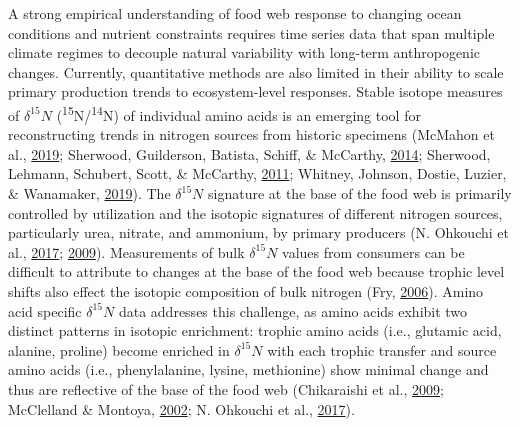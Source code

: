 \documentclass [11pt, proquest] {uwthesis}[2015/03/03]
\begin{document}
A strong empirical understanding of food web response to changing ocean
conditions and nutrient constraints requires time series data that span
multiple climate regimes to decouple natural variability with long-term
anthropogenic changes. Currently, quantitative methods are also limited
in their ability to scale primary production trends to ecosystem-level
responses. Stable isotope measures of \(\delta^{15}N\)
(\textsuperscript{15}N/\textsuperscript{14}N) of individual amino acids
is an emerging tool for reconstructing trends in nitrogen sources from
historic specimens (McMahon et al.,
\protect\hyperlink{ref-McMahon2019}{2019}; Sherwood, Guilderson,
Batista, Schiff, \& McCarthy,
\protect\hyperlink{ref-Sherwood2014}{2014}; Sherwood, Lehmann, Schubert,
Scott, \& McCarthy, \protect\hyperlink{ref-Sherwood2011}{2011}; Whitney,
Johnson, Dostie, Luzier, \& Wanamaker,
\protect\hyperlink{ref-Whitney2019}{2019}). The \(\delta^{15}N\)
signature at the base of the food web is primarily controlled by
utilization and the isotopic signatures of different nitrogen sources,
particularly urea, nitrate, and ammonium, by primary producers (N.
Ohkouchi et al., \protect\hyperlink{ref-Ohkouchi2017}{2017};
\protect\hyperlink{ref-Graham2010}{2009}). Measurements of bulk
\(\delta^{15}N\) values from consumers can be difficult to attribute to
changes at the base of the food web because trophic level shifts also
effect the isotopic composition of bulk nitrogen (Fry,
\protect\hyperlink{ref-Fry2006}{2006}). Amino acid specific
\(\delta^{15}N\) data addresses this challenge, as amino acids exhibit
two distinct patterns in isotopic enrichment: trophic amino acids (i.e.,
glutamic acid, alanine, proline) become enriched in \(\delta^{15}N\)
with each trophic transfer and source amino acids (i.e., phenylalanine,
lysine, methionine) show minimal change and thus are reflective of the
base of the food web (Chikaraishi et al.,
\protect\hyperlink{ref-Chikaraishi2009}{2009}; McClelland \& Montoya,
\protect\hyperlink{ref-McClelland2002}{2002}; N. Ohkouchi et al.,
\protect\hyperlink{ref-Ohkouchi2017}{2017}).
\end{document}
